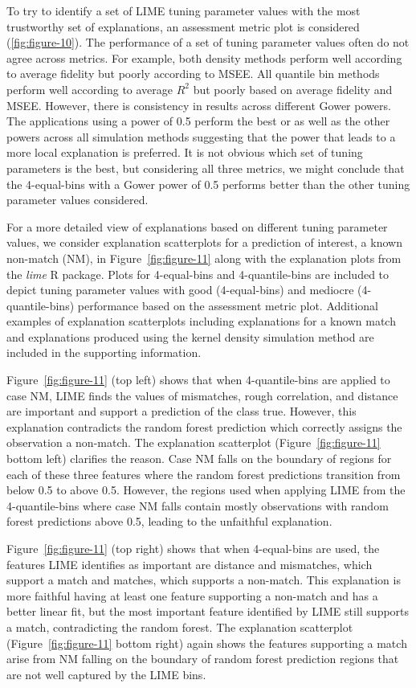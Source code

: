 \documentclass[AMS,STIX2COL]{WileyNJD-v2}\usepackage[]{graphicx}\usepackage[]{color}
\begin{document}
To try to identify a set of LIME tuning parameter values with the most trustworthy set of explanations, an assessment metric plot is considered (\autoref{fig:figure-10}). The performance of a set of tuning parameter values often do not agree across metrics. For example, both density methods perform well according to average fidelity but poorly according to MSEE. All quantile bin methods perform well according to average $R^2$ but poorly based on average fidelity and MSEE. However, there is consistency in results across different Gower powers. The applications using a power of 0.5 perform the best or as well as the other powers across all simulation methods suggesting that the power that leads to a more local explanation is preferred. It is not obvious  which set of tuning parameters is the best, but considering all three metrics, we might conclude that the 4-equal-bins with a Gower power of 0.5 performs better than the other tuning parameter values considered.

For a more detailed view of explanations based on different tuning parameter values, we consider explanation scatterplots for a prediction of interest, a known non-match (NM), in Figure~\ref{fig:figure-11} along with the explanation plots from the \emph{lime} R package. Plots for 4-equal-bins and 4-quantile-bins are included to depict tuning parameter values with good (4-equal-bins) and mediocre (4-quantile-bins) performance based on the assessment metric plot. Additional examples of explanation scatterplots including explanations for a known match and explanations produced using the kernel density simulation method are included in the supporting information.

Figure~\ref{fig:figure-11} (top left) shows that when 4-quantile-bins are applied to case NM, LIME finds the values of mismatches, rough correlation, and distance are important and support a prediction of the class true. However, this explanation contradicts the random forest prediction which correctly assigns the observation a non-match. The explanation scatterplot (Figure~\ref{fig:figure-11} bottom left) clarifies the reason. Case NM falls on the boundary of regions for each of these three features where the random forest predictions transition from below 0.5 to above 0.5. However, the regions used when applying LIME from the 4-quantile-bins where case NM falls contain mostly observations with random forest predictions above 0.5, leading to the unfaithful explanation.

Figure~\ref{fig:figure-11} (top right) shows that when 4-equal-bins are used, the features LIME identifies as important are distance and mismatches, which support a match and matches, which supports a non-match. This explanation is more faithful having at least one feature supporting a non-match and has a better linear fit, but the most important feature identified by LIME still supports a match, contradicting the random forest. The explanation scatterplot (Figure~\ref{fig:figure-11} bottom right) again shows the features supporting a match arise from NM falling on the boundary of random forest prediction regions that are not well captured by the LIME bins.
\end{document}
